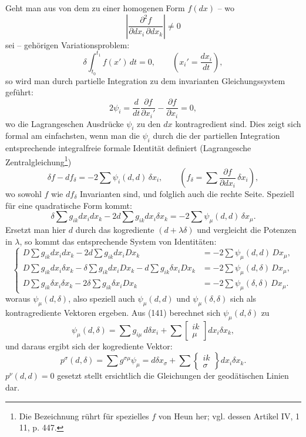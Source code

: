 \documentclass[11pt]{article}
\begin{document}
Geht man aus von dem zu einer homogenen Form $f(dx)$ -- wo
\[
\left|\frac{\partial^2 f}{\partial dx_i\,\partial dx_k}\right|\ne0
\]
sei -- gehörigen Variationsproblem:
\begin{equation}
 \delta\int_{t_0}^{t_1} f(x')\,dt=0,
 \qquad \left(x_i'=\frac{dx_i}{dt}\right),
\tag{140}
\end{equation}
so wird man durch partielle Integration zu dem invarianten Gleichungssystem geführt:
\[
 2\psi_i=\frac{d}{dt}\frac{\partial f}{\partial x_i'}-\frac{\partial f}{\partial x_i}=0,
\]
wo die Lagrangeschen Ausdrücke $\psi_i$ zu den $dx$ kontragredient sind. Dies zeigt sich formal am einfachsten, wenn man die $\psi_i$ durch die der partiellen Integration entsprechende integralfreie formale Identität definiert (Lagrangesche Zentralgleichung\footnote{Die Bezeichnung rührt für spezielles $f$ von Heun her; vgl. dessen Artikel IV, 1 11, p. 447.})
\[
 \delta f-df_\delta=-2\sum\psi_i(d,d)\,\delta x_i,
 \qquad
 \left(f_\delta=\sum\frac{\partial f}{\partial dx_i}\,\delta x_i\right),
\]
wo sowohl $f$ wie $df_\delta$ Invarianten sind, und folglich auch die rechte Seite. Speziell für eine quadratische Form kommt:
\[
 \delta\sum g_{ik}dx_i dx_k-2d\sum g_{ik}dx_i\delta x_k
 =-2\sum\psi_\mu(d,d)\,\delta x_\mu.
\]
Ersetzt man hier $d$ durch das kogrediente $(d+\lambda\delta)$ und vergleicht die Potenzen in $\lambda$, so kommt das entsprechende System von Identitäten:
\begin{equation}
\left\{
\begin{aligned}
D\sum g_{ik}dx_i dx_k-2d\sum g_{ik}dx_iDx_k
   &=-2\sum\psi_\mu(d,d)\,Dx_\mu,\\
D\sum g_{ik}dx_i\delta x_k-\delta\sum g_{ik}dx_iDx_k
   -d\sum g_{ik}\delta x_iDx_k
   &=-2\sum\psi_\mu(d,\delta)\,Dx_\mu,\\
D\sum g_{ik}\delta x_i\delta x_k-2\delta\sum g_{ik}\delta x_iDx_k
   &=-2\sum\psi_\mu(\delta,\delta)\,Dx_\mu.
\end{aligned}
\right.
\tag{141}
\end{equation}
woraus $\psi_\mu(d,\delta)$, also speziell auch $\psi_\mu(d,d)$ und $\psi_\mu(\delta,\delta)$ sich als kontragrediente Vektoren ergeben. Aus (141) berechnet sich $\psi_\mu(d,\delta)$ zu
\[
 \psi_\mu(d,\delta)=\sum g_{i\mu}\,d\delta x_i+
 \sum\left[\begin{smallmatrix}ik\\ \mu\end{smallmatrix}\right]dx_i\delta x_k,
\]
und daraus ergibt sich der kogrediente Vektor:
\begin{equation}
 p^\sigma(d,\delta)=\sum g^{\sigma\mu}\psi_\mu
 =d\delta x_\sigma+
 \sum\left\{\begin{smallmatrix}ik\\ \sigma\end{smallmatrix}\right\}dx_i\delta x_k.
\tag{142}
\end{equation}
$p^\nu(d,d)=0$ gesetzt stellt ersichtlich die Gleichungen der geodätischen Linien dar.
\end{document}
